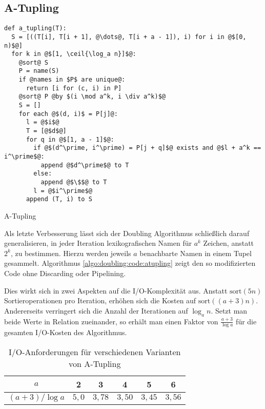 \subsection{A-Tupling}
\label{algo:doubling:sec:tupling}
\begin{listing}[htp]
\begin{verbatim}
def a_tupling(T):
  S = [((T[i], T[i + 1], @\dots@, T[i + a - 1]), i) for i in @$[0, n)$@]
  for k in @$[1, \ceil{\log_a n}]$@:
    @sort@ S
    P = name(S)
    if @names in $P$ are unique@:
      return [i for (c, i) in P]
    @sort@ P @by $(i \mod a^k, i \div a^k)$@
    S = []
    for each @$(d, i)$ = P[j]@:
      l = @$i$@
      T = [@$d$@]
      for q in @$[1, a - 1]$@:
        if @$(d^\prime, i^\prime) = P[j + q]$@ exists and @$l + a^k == i^\prime$@:
          append @$d^\prime$@ to T
        else:
          append @$\$$@ to T
        l = @$i^\prime$@
      append (T, i) to S
\end{verbatim}
\caption{A-Tupling} 
\label{algo:doubling:code:atupling}
\end{listing}

Als letzte Verbesserung lässt sich der Doubling Algorithmus schließlich darauf generalisieren, in jeder Iteration lexikografischen Namen für $a^k$ Zeichen, anstatt $2^k$, zu bestimmen. Hierzu werden jeweils $a$ benachbarte Namen in einem Tupel gesammelt. Algorithmus \ref{algo:doubling:code:atupling} zeigt den so modifizierten Code ohne Discarding oder Pipelining.

Dies wirkt sich in zwei Aspekten auf die I/O-Komplexität aus. Anstatt $\text{sort}(5n)$ Sortieroperationen pro Iteration, erhöhen sich die Kosten auf $\text{sort}((a+3)n)$. Andererseits verringert sich die Anzahl der Iterationen auf $\log_a n$. Setzt man beide Werte in Relation zueinander, so erhält man einen Faktor von $\frac{a + 3}{\log a}$ für die gesamten I/O-Kosten des Algorithmus. 

\begin{table}
\centering
\begin{tabular}{cccccc}
\toprule
$a$ & 2 & 3 & 4 & 5 & 6 \\ 
\midrule 
$(a+3) / \log a$ & $5,0$ & $3,78$ & $3,50$ & $3,45$ & $3,56$ \\ 
\bottomrule
\end{tabular} 
\caption{I/O-Anforderungen für verschiedenen Varianten von A-Tupling}
\label{algo:doubling:tab:tab1}
\end{table}

